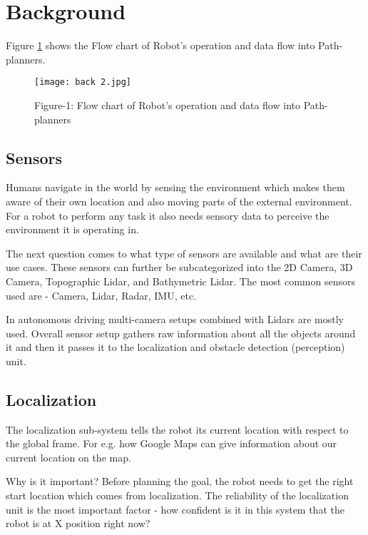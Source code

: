 \documentclass[9pt,a4paper,twoside]{rho-class/rho}
\begin{document}
\section{Background}

    Figure \ref{fig:figure} shows the Flow chart of Robot’s operation and data flow into Path-planners.
        
            \begin{figure}[H]
                \centering
                \texttt{[image: back 2.jpg]}
                \caption{Figure-1: Flow chart of Robot’s operation and data flow into Path-planners}
                \label{fig:figure}
            \end{figure}


    \subsection{Sensors}
    
        Humans navigate in the world by sensing the environment which makes them aware of their own location and also moving parts of the external environment. For a robot to perform any task it also needs sensory data to perceive the environment it is operating in. 
        
        The next question comes to what type of sensors are available and what are their use cases. These sensors can further be subcategorized into the 2D Camera, 3D Camera, Topographic Lidar, and Bathymetric Lidar. The most common sensors used are - Camera, Lidar, Radar, IMU, etc. 
        
        In autonomous driving multi-camera setups combined with Lidars are mostly used. Overall sensor setup gathers raw information about all the objects around it and then it passes it to the localization and obstacle detection (perception) unit. 

    \subsection{Localization}

        The localization sub-system tells the robot its current location with respect to the global frame. For e.g. how Google Maps can give information about our current location on the map. 
        
        Why is it important? Before planning the goal, the robot needs to get the right start location which comes from localization. The reliability of the localization unit is the most important factor - how confident is it in this system that the robot is at X position right now? 
        
\end{document}
